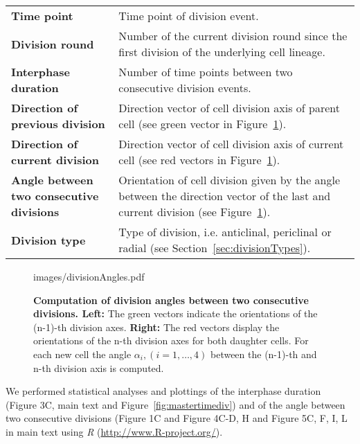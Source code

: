 \documentclass[11pt,a4paper, final]{article}
\begin{document}
\noindent
\begin{tabularx}{\textwidth}{@{} >{\RaggedRight}p{6.8cm} X @{}}
\textbf{Time point} &
Time point of division event.\\
\textbf{Division round} &
Number of the current division round since the first division of the underlying cell lineage.\\
\textbf{Interphase duration}&
Number of time points between two consecutive division events.\\
\textbf{Direction of previous division} &
Direction vector of cell division axis of parent cell  (see green vector in Figure~\ref{fig:divisionAngles}).\\
\textbf{Direction of current division} &
Direction vector of cell division axis of current cell  (see red vectors in Figure~\ref{fig:divisionAngles}).\\
\textbf{Angle between two consecutive divisions}&
Orientation of cell division given by the angle between the direction vector of the last and current division (see Figure~\ref{fig:divisionAngles}).\\
\textbf{Division type} &
Type of division, i.e. anticlinal, periclinal or radial (see Section~\ref{sec:divisionTypes}).\\
\end{tabularx}
%
\begin{figure}[htbp]
	\begin{center}
		\begin{overpic}[width=0.7\linewidth]{images/divisionAngles.pdf}
		\end{overpic}
\caption[]
{
{\bf Computation of division angles between two consecutive divisions. Left:} The green vectors indicate the orientations of the (n-1)-th division axes. \textbf{Right:} The red vectors display the orientations of the n-th division axes for both daughter cells. For each new cell the angle $\alpha_i, (i=1,\ldots,4)$ between the (n-1)-th and n-th division axis is computed.
}
	\label{fig:divisionAngles}
	\end{center}
\end{figure}
%

\noindent
We performed statistical analyses and plottings of the interphase duration (Figure 3C, main text and Figure~\ref{fig:mastertimediv}) and of the angle between two consecutive divisions (Figure 1C and Figure 4C-D, H and Figure 5C, F, I, L in main text using \textit{R} (\href{http://www.R-project.org/}{http://www.R-project.org/}).

\clearpage
\end{document}

